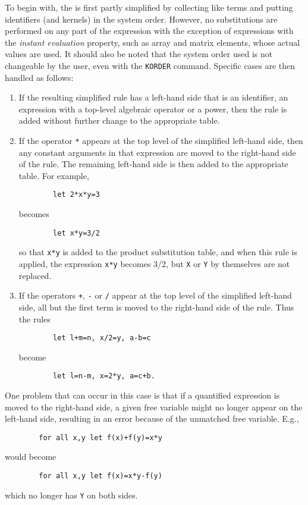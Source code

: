 To begin with, the  is first partly
simplified by collecting like terms and putting identifiers (and kernels)
in the system order.  However, no substitutions are performed on any part
of the expression with the exception of expressions with the \emph{instant
evaluation} property, such as array and matrix elements, whose actual
values are used.  It should also be noted that the system order used is
not changeable by the user, even with the \texttt{KORDER} command.  Specific
cases are then handled as follows:
\begin{enumerate}
\item If the resulting simplified rule has a left-hand side that is an
identifier, an expression with a top-level algebraic operator or a power,
then the rule is added without further change to the appropriate table.

\item If the operator \texttt{*} appears at the top level of the simplified left-hand
side, then any constant arguments in that expression are moved to the
right-hand side of the rule.  The remaining left-hand side is then added
to the appropriate table.  For example,
\begin{verbatim}
        let 2*x*y=3
\end{verbatim}
becomes
\begin{verbatim}
        let x*y=3/2
\end{verbatim}
so that \texttt{x*y} is added to the product substitution table, and when
this rule is applied, the expression \texttt{x*y} becomes 3/2, but \texttt{X} or
\texttt{Y} by themselves are not replaced.

\item If the operators \texttt{+}, \texttt{-} or \texttt{/} appear at the top level
of the simplified left-hand side, all but the first term is moved to the
right-hand side of the rule.  Thus the rules
\begin{verbatim}
        let l+m=n, x/2=y, a-b=c
\end{verbatim}
become
\begin{verbatim}
        let l=n-m, x=2*y, a=c+b.
\end{verbatim}
\end{enumerate}
One problem that can occur in this case is that if a quantified expression
is moved to the right-hand side, a given free variable might no longer
appear on the left-hand side, resulting in an error because of the
unmatched free variable. E.g.,
\begin{verbatim}
        for all x,y let f(x)+f(y)=x*y
\end{verbatim}
would become
\begin{verbatim}
        for all x,y let f(x)=x*y-f(y)
\end{verbatim}
which no longer has \texttt{Y} on both sides.

